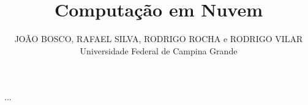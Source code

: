 \documentclass[acmcsur,acmnow]{acmtrans2m}
\title{Computação em Nuvem}
\author{JOÃO BOSCO, RAFAEL SILVA, RODRIGO ROCHA e RODRIGO VILAR\\
Universidade Federal de Campina Grande
}
\begin{document}
            
\begin{bottomstuff} 
...
\end{bottomstuff}
            
\maketitle






\begin{received}
\end{received}
\end{document}
